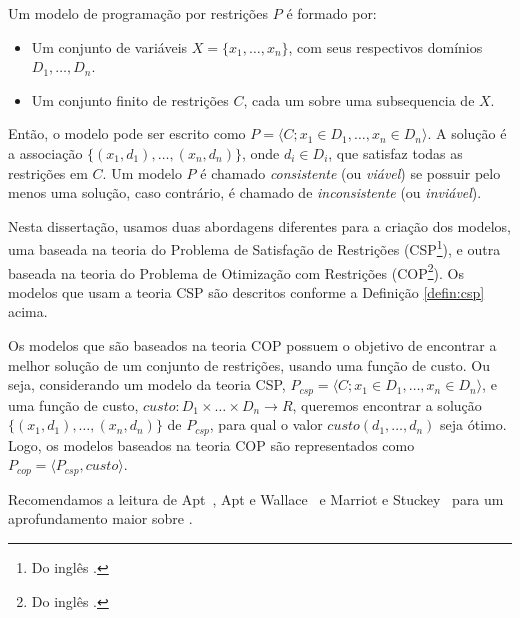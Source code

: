 \begin{defin}
\label{defin:csp}
Um modelo de programação por restrições $P$ é formado por:
\begin{itemize}
  \item{Um conjunto de variáveis $X = \{x_{1}, \ldots, x_{n}\}$, com
  seus respectivos domínios $D_{1}, \ldots, D_{n}$.}

  \item{Um conjunto finito de restrições $C$, cada um sobre uma
  subsequencia de $X$.}
\end{itemize}
\end{defin}

Então, o modelo pode ser escrito como $P = \langle C; x_{1} \in
D_{1}, \ldots, x_{n} \in D_{n} \rangle$. A solução é a associação
$\{(x_{1}, d_{1}), \ldots, (x_{n}, d_{n})\}$, onde $d_{i} \in D_{i}$,
que satisfaz todas as restrições em $C$. Um modelo $P$ é
chamado \textit{consistente} (ou \textit{viável}) se possuir pelo
menos uma solução, caso contrário, é chamado de \textit{inconsistente}
(ou \textit{inviável}).

Nesta dissertação, usamos duas abordagens diferentes para a criação
dos modelos, uma baseada na teoria do Problema de Satisfação de
Restrições (CSP\footnote{Do inglês .}), e outra baseada na teoria do Problema de Otimização com
Restrições (COP\footnote{Do inglês .}). Os modelos que usam a teoria CSP são descritos conforme
a Definição \ref{defin:csp} acima.

Os modelos que são baseados na teoria COP possuem o objetivo de
encontrar a melhor solução de um conjunto de restrições, usando uma
função de custo. Ou seja, considerando um modelo da teoria CSP,
$P_{csp} = \langle C; x_{1} \in D_{1}, \ldots, x_{n} \in
D_{n} \rangle$, e uma função de custo, $custo:
D_{1} \times \ldots \times D_{n} \to R$, queremos encontrar a solução
$\{(x_{1}, d_{1}), \ldots, (x_{n}, d_{n})\}$ de $P_{csp}$, para qual o
valor $custo(d_{1}, \ldots, d_{n})$ seja ótimo. Logo, os modelos
baseados na teoria COP são representados como $P_{cop} = \langle P_{csp},
custo \rangle$.

Recomendamos a leitura de Apt~\cite{Apt*2003}, Apt e
Wallace~\cite{AptWallace*2007} e Marriot e
Stuckey~\cite{Marriott*1998} para um aprofundamento maior sobre \pr{}.

